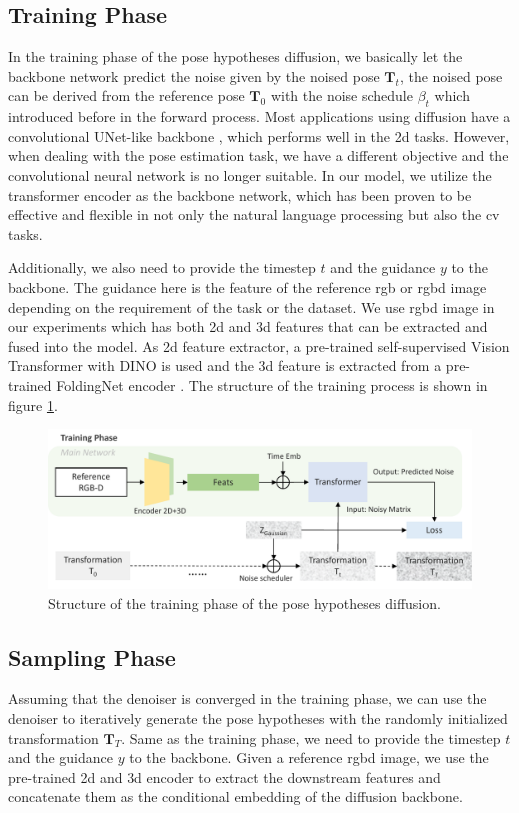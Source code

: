 \documentclass[12pt,DIV14,BCOR12mm,a4paper,footinclude=false,headinclude,parskip=half-,twoside,openright,cleardoublepage=empty,toc=index,bibliography=totoc,listof=totoc]{scrreprt}
\numberwithin{equation}{chapter}
\begin{document}
\subsection{Training Phase}
In the training phase of the pose hypotheses diffusion, we basically let the backbone network predict the noise given by the noised pose $\mathbf{T}_{t}$, the noised pose can be derived from the reference pose $\mathbf{T}_{0}$ with the noise schedule $\beta_{t}$ which introduced before in the forward process. Most applications using diffusion have a convolutional UNet-like backbone \cite{ronneberger2015unet}, which performs well in the \gls{2d} tasks. However, when dealing with the pose estimation task, we have a different objective and the convolutional neural network is no longer suitable. In our model, we utilize the transformer encoder as the backbone network, which has been proven to be effective and flexible in not only the natural language processing but also the \gls{cv} tasks.

Additionally, we also need to provide the timestep $t$ and the guidance $y$ to the backbone. The guidance here is the feature of the reference \gls{rgb} or \gls{rgbd} image depending on the requirement of the task or the dataset. We use \gls{rgbd} image in our experiments which has both \gls{2d} and \gls{3d} features that can be extracted and fused into the model. As \gls{2d} feature extractor, a pre-trained self-supervised Vision Transformer
 with DINO \cite{caron2021emerging} is used and the \gls{3d} feature is extracted from a pre-trained FoldingNet encoder \cite{yang2018foldingnet}. The structure of the training process is shown in figure \ref{img:train}.

\begin{figure}[h]
	\centering
	\includegraphics[width=1.0\textwidth]{img/train.pdf}
	\caption{Structure of the training phase of the pose hypotheses diffusion.}
	\label{img:train}
\end{figure}

\subsection{Sampling Phase}
Assuming that the denoiser is converged in the training phase, we can use the denoiser to iteratively generate the pose hypotheses with the randomly initialized transformation $\mathbf{T}_{T}$. Same as the training phase, we need to provide the timestep $t$ and the guidance $y$ to the backbone. Given a reference \gls{rgbd} image, we use the pre-trained \gls{2d} and \gls{3d} encoder to extract the downstream features and concatenate them as the conditional embedding of the diffusion backbone. 
\end{document}
